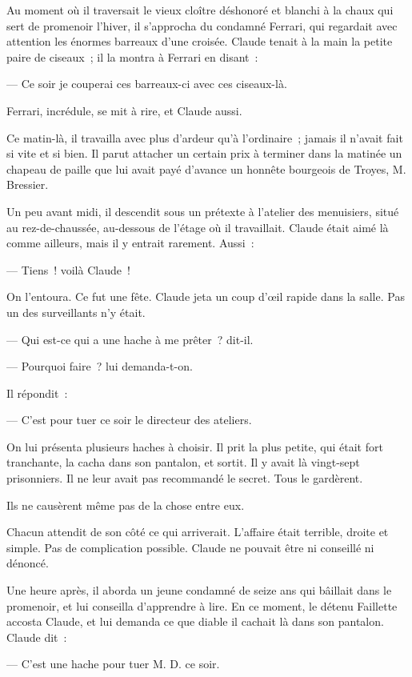 \documentclass[french,twoside]{book} %
\begin{document}
Au moment où il traversait le vieux cloître déshonoré et blanchi à la chaux qui sert de promenoir l’hiver, il s’approcha du condamné Ferrari, qui regardait avec attention les énormes barreaux d’une croisée. Claude tenait à la main la petite paire de ciseaux ; il la montra à Ferrari en disant :\par
— Ce soir je couperai ces barreaux-ci avec ces ciseaux-là.\par
Ferrari, incrédule, se mit à rire, et Claude aussi.\par
Ce matin-là, il travailla avec plus d’ardeur qu’à l’ordinaire ; jamais il n’avait fait si vite et si bien. Il parut attacher un certain prix à terminer dans la  matinée un chapeau de paille que lui avait payé d’avance un honnête bourgeois de Troyes, M. Bressier.\par
Un peu avant midi, il descendit sous un prétexte à l’atelier des menuisiers, situé au rez-de-chaussée, au-dessous de l’étage où il travaillait. Claude était aimé là comme ailleurs, mais il y entrait rarement. Aussi :\par
— Tiens ! voilà Claude !\par
On l’entoura. Ce fut une fête. Claude jeta un coup d’œil rapide dans la salle. Pas un des surveillants n’y était.\par
— Qui est-ce qui a une hache à me prêter ? dit-il.\par
— Pourquoi faire ? lui demanda-t-on.\par
Il répondit :\par
— C’est pour tuer ce soir le directeur des ateliers.\par
On lui présenta plusieurs haches à choisir. Il prit la plus petite, qui était fort tranchante, la cacha dans son pantalon, et sortit. Il y avait là vingt-sept prisonniers. Il ne leur avait pas recommandé le secret. Tous le gardèrent.\par
Ils ne causèrent même pas de la chose entre eux.\par
Chacun attendit de son côté ce qui arriverait. L’affaire était terrible, droite et simple. Pas de complication possible. Claude ne pouvait être ni conseillé ni dénoncé.\par
Une heure après, il aborda un jeune condamné de seize ans qui bâillait dans le promenoir, et lui conseilla d’apprendre à lire. En ce moment, le détenu Faillette accosta Claude, et lui demanda ce que diable il cachait là dans son pantalon. Claude dit :\par
 — C’est une hache pour tuer M. D. ce soir.\par
\end{document}
